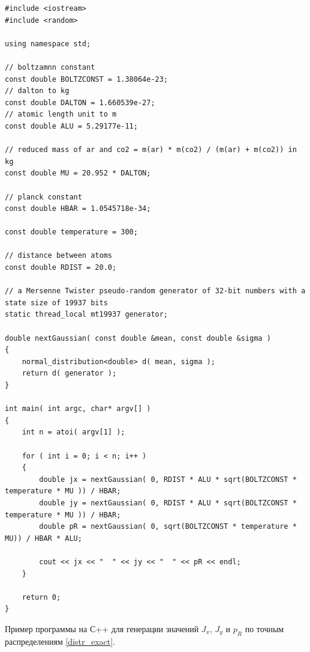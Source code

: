 \begin{lstlisting}
#include <iostream>
#include <random>

using namespace std;

// boltzamnn constant 
const double BOLTZCONST = 1.38064e-23;
// dalton to kg 
const double DALTON = 1.660539e-27;
// atomic length unit to m 
const double ALU = 5.29177e-11;

// reduced mass of ar and co2 = m(ar) * m(co2) / (m(ar) + m(co2)) in kg
const double MU = 20.952 * DALTON;

// planck constant 
const double HBAR = 1.0545718e-34;

const double temperature = 300;

// distance between atoms 
const double RDIST = 20.0;

// a Mersenne Twister pseudo-random generator of 32-bit numbers with a state size of 19937 bits
static thread_local mt19937 generator;
 
double nextGaussian( const double &mean, const double &sigma )
{
    normal_distribution<double> d( mean, sigma );
    return d( generator ); 
} 

int main( int argc, char* argv[] )
{
	int n = atoi( argv[1] );

	for ( int i = 0; i < n; i++ )
	{
		double jx = nextGaussian( 0, RDIST * ALU * sqrt(BOLTZCONST * temperature * MU )) / HBAR;
		double jy = nextGaussian( 0, RDIST * ALU * sqrt(BOLTZCONST * temperature * MU )) / HBAR;
		double pR = nextGaussian( 0, sqrt(BOLTZCONST * temperature * MU)) / HBAR * ALU;

		cout << jx << "  " << jy << "  " << pR << endl;
	}

	return 0;
}
\end{lstlisting}

Пример программы на С++ для генерации значений $J_x$, $J_y$ и $p_R$ по точным распределениям \eqref{distr_exact}.
